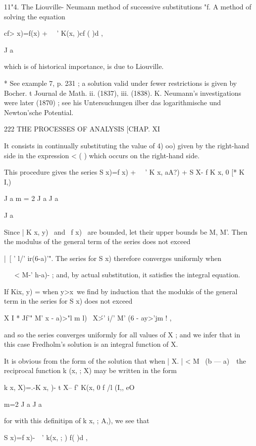 {11"4. The Liouville- Neumann method of successive substitutions "f. 
A method of solving the equation 

cf> x)=f(x) + \ \ ' K(x, )cf ( )d , 

J a 

which is of historical importance, is due to Liouville. 

* See example 7, p. 231 ; a solution valid under fewer restrictions is given by Bocher. 
t Journal de Math. ii. (1837), iii. (1838). K. Neumann's investigations were later (1870) ; 
see his Untersuchungen ilber das logarithmische und Newton'sche Potential. 



222 THE PROCESSES OF ANALYSIS [CHAP. XI 

It consists in continually substituting the value of 4) oo) given by the 
right-hand side in the expression <  ( ) which occurs on the right-hand side. 

This procedure gives the series 
S x)=f x) + \ \ ' K x, aA?) + S X- f K x,  0 [* K    I,) 

J a m = 2 J a J a 

J a 

Since | K x, y) \ and \ f x) \ are bounded, let their upper bounds be M, M'. 
Then the modulus of the general term of the series does not exceed 

|\ [ ' l/' ir(6-a)'". 
The series for S  x) therefore converges uniformly when 

\ \ \ < M-' h-a)- ; 
and, by actual substitution, it satisfies the integral equation. 

If Kix, y) = when y>x\ we find by induction that the modukis of the general 
term in the series for S  x) does not exceed 

X I  * Jf'" M'  x - a)>"l m l) \ X\'>' i/'  M' (6 - ay>'jm ! , 

and so the series converges uniformly for all values of X ; and we infer that in this case 
Fredholm's solution is an integral function of X. 

It is obvious from the form of the solution that when | X. | < M~  (b — a)~\ 
the reciprocal function k (x,   ; X) may be written in the form 

k x,   X)=.-K x,  )- t X-- f' K(x,  0 f /l (I,, eO 

m=2 J a J a 

for with this definitipn of k  x,   ; A,), we see that 

S x)=f x)-\ \ ' k(x, ; ) f( )d , 

}
